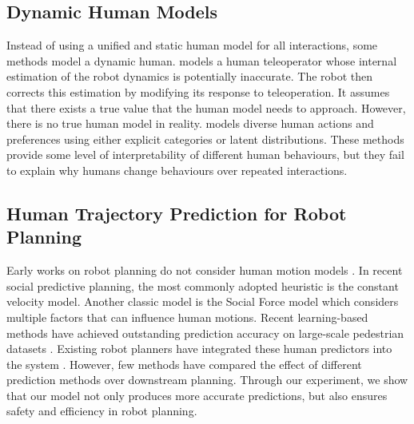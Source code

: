 \subsection{Dynamic Human Models}
Instead of using a unified and static human model for all interactions, some methods model a dynamic human. 
\cite{tian2023towards} models a human teleoperator whose internal estimation of the robot dynamics is potentially inaccurate. The robot then corrects this estimation by modifying its response to teleoperation. It assumes that there exists a true value that the human model needs to approach. However, there is no true human model in reality. 
\cite{parekh2023learning, muktadir2024adaptive, cathcart2023proactive} models diverse human actions and preferences using either explicit categories or latent distributions.
These methods provide some level of interpretability of different human behaviours, but they fail to explain why humans change behaviours over repeated interactions.

\subsection{Human Trajectory Prediction for Robot Planning}
\label{seq:traj_prediction}
Early works on robot planning do not consider human motion models \cite{wu2019depth, wu2018learn, wu2021learn, wu2020achieving, wu2019bnd, wu2019tdpp, cao2022direct}.
In recent social predictive planning, the most commonly adopted heuristic is the constant velocity model. 
Another classic model is the Social Force model \cite{helbing1995social} which considers multiple factors that can influence human motions. 
Recent learning-based methods have achieved outstanding prediction accuracy on large-scale pedestrian datasets \cite{salzmann2020trajectron++, xu2022remember}. 
Existing robot planners have integrated these human predictors into the system \cite{cao2024learningdynamicweightadjustment, boldrer2022multi, boldrer2020socially, ryu2024integrating, poddar2023crowd}. 
However, few methods have compared the effect of different prediction methods over downstream planning. 
Through our experiment, we show that our model not only produces more accurate predictions, but also ensures safety and efficiency in robot planning.